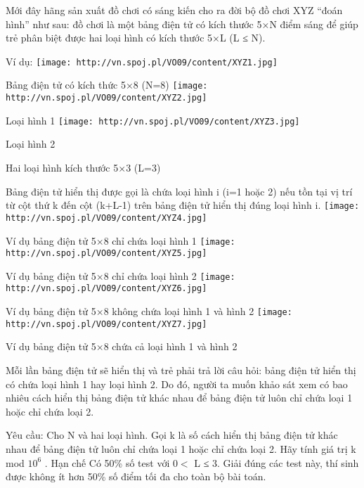 Mới đây hãng sản xuất đồ chơi có sáng kiến cho ra đời bộ đồ chơi XYZ “đoán hình” như sau: đồ chơi là một bảng điện tử có kích thước 5×N điểm sáng để giúp trẻ phân biệt được hai loại hình có kích thước 5×L (L ≤ N).  

   Ví dụ:  
\texttt{[image: http://vn.spoj.pl/VO09/content/XYZ1.jpg]}

               Bảng điện tử có kích thức 5×8 (N=8)             
\texttt{[image: http://vn.spoj.pl/VO09/content/XYZ2.jpg]}

                       Loại hình 1                     
\texttt{[image: http://vn.spoj.pl/VO09/content/XYZ3.jpg]}

                       Loại hình 2                     

                       Hai loại hình kích thước 5×3 (L=3)                     

   Bảng điện tử hiển thị được gọi là chứa loại hình i (i=1 hoặc 2) nếu tồn tại vị trí từ cột thứ k đến cột (k+L-1) trên bảng điện tử hiển thị đúng loại hình i.  
\texttt{[image: http://vn.spoj.pl/VO09/content/XYZ4.jpg]}

               Ví dụ bảng điện tử 5×8 chỉ chứa loại hình 1             
\texttt{[image: http://vn.spoj.pl/VO09/content/XYZ5.jpg]}

               Ví dụ bảng điện tử 5×8 chỉ chứa loại hình 2             
\texttt{[image: http://vn.spoj.pl/VO09/content/XYZ6.jpg]}

               Ví dụ bảng điện tử 5×8  không chứa loại hình 1 và hình 2             
\texttt{[image: http://vn.spoj.pl/VO09/content/XYZ7.jpg]}

               Ví dụ bảng điện tử 5×8  chứa cả loại hình 1 và hình 2             

   Mỗi lần bảng điện tử sẽ hiển thị và trẻ phải trả lời câu hỏi: bảng điện tử hiển thị có chứa loại hình 1 hay loại hình 2. Do đó, người ta muốn khảo sát xem có bao nhiêu cách hiển thị bảng điện tử khác nhau để bảng điện tử luôn chỉ chứa loại 1 hoặc chỉ chứa loại 2.  

   Yêu cầu: Cho N và hai loại hình. Gọi k là số cách hiển thị bảng điện tử khác nhau để bảng điện tử luôn chỉ chứa loại 1 hoặc chỉ chứa loại 2. Hãy tính giá trị k  mod $10^{6}$   .
   Hạn chế  
Có 50\% số test với 0$<$ L ≤ 3. Giải đúng các test này, thí sinh được không ít hơn 50\% số điểm tối đa cho toàn bộ bài toán.